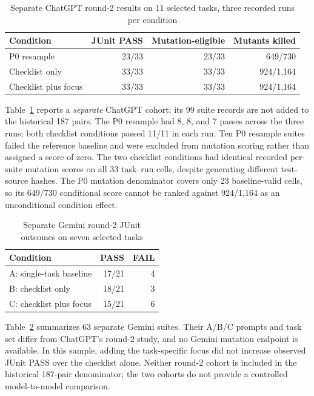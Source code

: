 \begin{table}[t]
\caption{Separate ChatGPT round-2 results on 11 selected tasks, three recorded runs per condition}
\label{tab:round2}
\centering\scriptsize
\begin{tabular}{@{}lrrr@{}}
\toprule
Condition & JUnit PASS & Mutation-eligible & Mutants killed \\
\midrule
P0 resample & 23/33 & 23/33 & 649/730 \\
Checklist only & 33/33 & 33/33 & 924/1,164 \\
Checklist plus focus & 33/33 & 33/33 & 924/1,164 \\
\bottomrule
\end{tabular}
\end{table}

Table~\ref{tab:round2} reports a \emph{separate} ChatGPT cohort; its 99 suite records are not added to the historical 187 pairs. The P0 resample had 8, 8, and 7 passes across the three runs; both checklist conditions passed 11/11 in each run. Ten P0 resample suites failed the reference baseline and were excluded from mutation scoring rather than assigned a score of zero. The two checklist conditions had identical recorded per-suite mutation scores on all 33 task--run cells, despite generating different test-source hashes. The P0 mutation denominator covers only 23 baseline-valid cells, so its 649/730 conditional score cannot be ranked against 924/1,164 as an unconditional condition effect.

\begin{table}[t]
\caption{Separate Gemini round-2 JUnit outcomes on seven selected tasks}
\label{tab:gemini_round2}
\centering\scriptsize
\begin{tabular}{@{}lrr@{}}
\toprule
Condition & PASS & FAIL \\
\midrule
A: single-task baseline & 17/21 & 4 \\
B: checklist only & 18/21 & 3 \\
C: checklist plus focus & 15/21 & 6 \\
\bottomrule
\end{tabular}
\end{table}

Table~\ref{tab:gemini_round2} summarizes 63 separate Gemini suites. Their A/B/C prompts and task set differ from ChatGPT's round-2 study, and no Gemini mutation endpoint is available. In this sample, adding the task-specific focus did not increase observed JUnit PASS over the checklist alone. Neither round-2 cohort is included in the historical 187-pair denominator; the two cohorts do not provide a controlled model-to-model comparison.
